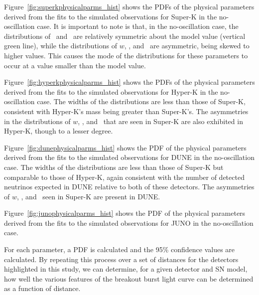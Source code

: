 
Figure~\ref{fig:superkphysicalparms_hist} shows the PDFs of the
physical parameters derived from the fits to the simulated
observations for Super-K in the no-oscillation case.  
It is important to
note is that, in the no-oscillation case, 
the distributions of \lmax\ and \tmax\ are relatively
symmetric about the model value (vertical green line), 
while the distributions of $w$, \trise, and \tfall\ are 
asymmetric, being skewed to higher values.  This causes the mode of the
distributions for these parameters to occur at a value
smaller than the model value.

Figure~\ref{fig:hyperkphysicalparms_hist} shows the PDFs of the
physical parameters derived from the fits to the simulated
observations for Hyper-K in the no-oscillation case.  
The widths of the distributions are less than 
those of Super-K, consistent with Hyper-K's mass being
greater than Super-K's.  The asymmetries in the
distributions of 
$w$, \trise, and \tfall\ that are seen in
Super-K are also exhibited in Hyper-K, though to a lesser degree.

Figure~\ref{fig:dunephysicalparms_hist} shows the PDF of the
physical parameters derived from the fits to the simulated
observations for DUNE in the no-oscillation case.  The widths of the
distributions are less than 
those of Super-K but comparable to those of Hyper-K, again consistent with the number of
detected neutrinos expected in DUNE relative to both of these
detectors.  The asymmetries of $w$, \trise, and \tfall\ seen in
Super-K are present in DUNE.  

Figure~\ref{fig:junophysicalparms_hist} shows the PDF of the
physical parameters derived from the fits to the simulated
observations for JUNO in the no-oscillation case.  


For each parameter, a PDF is calculated and the 95\%
confidence values are calculated.  By repeating this process over a
set of distances for the detectors highlighted in this study, we can
determine, for a given detector and SN model, how well the various
features of the breakout burst light curve can be determined as a
function of distance.


